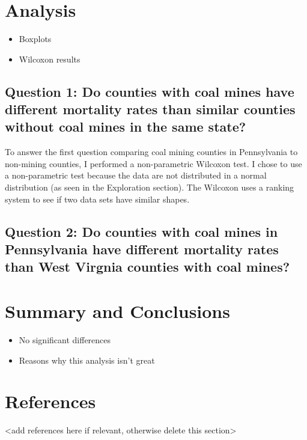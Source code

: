 \documentclass[
  12pt,
]{article}
\providecommand{\tightlist}{%
  \setlength{\itemsep}{0pt}\setlength{\parskip}{0pt}}
\begin{document}
\newpage

\hypertarget{analysis}{%
\section{Analysis}\label{analysis}}

\begin{itemize}
\tightlist
\item
  Boxplots
\item
  Wilcoxon results
\end{itemize}

\hypertarget{question-1-do-counties-with-coal-mines-have-different-mortality-rates-than-similar-counties-without-coal-mines-in-the-same-state}{%
\subsection{Question 1: Do counties with coal mines have different
mortality rates than similar counties without coal mines in the same
state?}\label{question-1-do-counties-with-coal-mines-have-different-mortality-rates-than-similar-counties-without-coal-mines-in-the-same-state}}

To answer the first question comparing coal mining counties in
Pennsylvania to non-mining counties, I performed a non-parametric
Wilcoxon test. I chose to use a non-parametric test because the data are
not distributed in a normal distribution (as seen in the Exploration
section). The Wilcoxon uses a ranking system to see if two data sets
have similar shapes.

\hypertarget{question-2-do-counties-with-coal-mines-in-pennsylvania-have-different-mortality-rates-than-west-virgnia-counties-with-coal-mines}{%
\subsection{Question 2: Do counties with coal mines in Pennsylvania have
different mortality rates than West Virgnia counties with coal
mines?}\label{question-2-do-counties-with-coal-mines-in-pennsylvania-have-different-mortality-rates-than-west-virgnia-counties-with-coal-mines}}

\newpage

\hypertarget{summary-and-conclusions}{%
\section{Summary and Conclusions}\label{summary-and-conclusions}}

\begin{itemize}
\tightlist
\item
  No significant differences
\item
  Reasons why this analysis isn't great
\end{itemize}

\newpage

\hypertarget{references}{%
\section{References}\label{references}}

\textless add references here if relevant, otherwise delete this
section\textgreater{}
\end{document}

